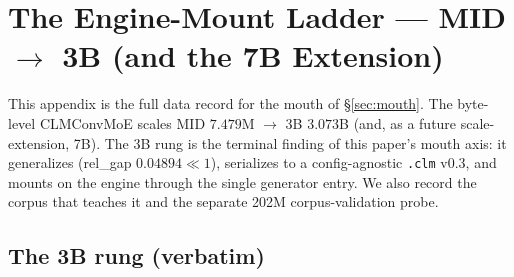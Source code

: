\section{The Engine-Mount Ladder --- MID $\rightarrow$ 3B (and the 7B Extension)}
\label{app:engine_mount}

This appendix is the full data record for the mouth of \S\ref{sec:mouth}. The
byte-level CLMConvMoE scales MID $7.479$M $\rightarrow$ 3B $3.073$B (and, as a
future scale-extension, 7B). The 3B rung is the terminal finding of this paper's
mouth axis: it generalizes (rel\_gap $0.04894\ll1$), serializes to a
config-agnostic \texttt{.clm} v0.3, and mounts on the engine through the single
generator entry. We also record the corpus that teaches it and the separate
202M corpus-validation probe.

\subsection{The 3B rung (verbatim)}
\label{app:fm-3b}

